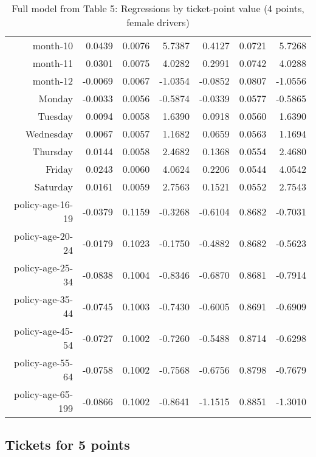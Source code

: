 \documentclass[10pt]{article}
\begin{document}
\begin{table}[ht]
\begin{tabular}{rrrrrrr}
  month-10 & 0.0439 & 0.0076 & 5.7387 & 0.4127 & 0.0721 & 5.7268 \\ 
  month-11 & 0.0301 & 0.0075 & 4.0282 & 0.2991 & 0.0742 & 4.0288 \\ 
  month-12 & -0.0069 & 0.0067 & -1.0354 & -0.0852 & 0.0807 & -1.0556 \\ 
  Monday & -0.0033 & 0.0056 & -0.5874 & -0.0339 & 0.0577 & -0.5865 \\ 
  Tuesday & 0.0094 & 0.0058 & 1.6390 & 0.0918 & 0.0560 & 1.6390 \\ 
  Wednesday & 0.0067 & 0.0057 & 1.1682 & 0.0659 & 0.0563 & 1.1694 \\ 
  Thursday & 0.0144 & 0.0058 & 2.4682 & 0.1368 & 0.0554 & 2.4680 \\ 
  Friday & 0.0243 & 0.0060 & 4.0624 & 0.2206 & 0.0544 & 4.0542 \\ 
  Saturday & 0.0161 & 0.0059 & 2.7563 & 0.1521 & 0.0552 & 2.7543 \\ 
  policy-age-16-19 & -0.0379 & 0.1159 & -0.3268 & -0.6104 & 0.8682 & -0.7031 \\ 
  policy-age-20-24 & -0.0179 & 0.1023 & -0.1750 & -0.4882 & 0.8682 & -0.5623 \\ 
  policy-age-25-34 & -0.0838 & 0.1004 & -0.8346 & -0.6870 & 0.8681 & -0.7914 \\ 
  policy-age-35-44 & -0.0745 & 0.1003 & -0.7430 & -0.6005 & 0.8691 & -0.6909 \\ 
  policy-age-45-54 & -0.0727 & 0.1002 & -0.7260 & -0.5488 & 0.8714 & -0.6298 \\ 
  policy-age-55-64 & -0.0758 & 0.1002 & -0.7568 & -0.6756 & 0.8798 & -0.7679 \\ 
  policy-age-65-199 & -0.0866 & 0.1002 & -0.8641 & -1.1515 & 0.8851 & -1.3010 \\ 
   \hline
\end{tabular}
\caption{Full model from Table 5: Regressions by ticket-point value (4 points, female drivers)} 
\label{tab_5_4_pts_F}
\end{table}


\clearpage
\pagebreak




\subsection*{Tickets for 5 points}



\end{document}
